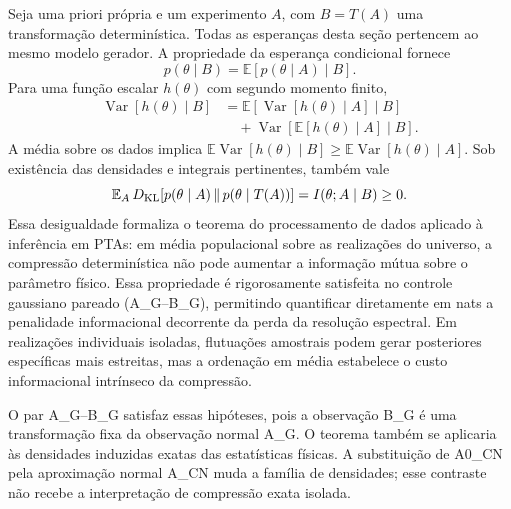 Seja uma priori própria e um experimento \(A\), com \(B=T(A)\) uma
transformação determinística. Todas as esperanças desta seção pertencem
ao mesmo modelo gerador. A propriedade da esperança condicional fornece
\begin{equation}
 p(\theta\mid B)=\mathbb E\!\left[p(\theta\mid A)\mid B\right].
 \label{eq:comp-posterior-condicional}
\end{equation}
Para uma função escalar \(h(\theta)\) com segundo momento finito,
\begin{align}
 \operatorname{Var}[h(\theta)\mid B]
 &=\mathbb E\!\left[\operatorname{Var}[h(\theta)\mid A]\mid B\right]
 \nonumber\\
 &\quad+\operatorname{Var}\!\left[\mathbb E[h(\theta)\mid A]\mid B\right].
 \label{eq:comp-variancia}
\end{align}
A média sobre os dados implica
\(\mathbb E\operatorname{Var}[h(\theta)\mid B]\geq
\mathbb E\operatorname{Var}[h(\theta)\mid A]\).
Sob existência das densidades e integrais pertinentes, também vale
\begin{equation}
 \mathbb E_A\,D_{\rm KL}\!\left[p(\theta\mid A)\,\Vert\,
                     p(\theta\mid T(A))\right]
 =I(\theta;A\mid B)\geq0.
 \label{eq:comp-informacao}
\end{equation}
Essa desigualdade formaliza o teorema do processamento de dados aplicado à
inferência em PTAs: em média populacional sobre as realizações do universo,
a compressão determinística não pode aumentar a informação mútua sobre o
parâmetro físico. Essa propriedade é rigorosamente satisfeita no controle
gaussiano pareado (A\_G--B\_G), permitindo quantificar diretamente em nats
a penalidade informacional decorrente da perda da resolução espectral. Em
realizações individuais isoladas, flutuações amostrais podem gerar posteriores
específicas mais estreitas, mas a ordenação em média estabelece o custo
informacional intrínseco da compressão.

O par A\_G--B\_G satisfaz essas hipóteses, pois a observação B\_G é uma
transformação fixa da observação normal A\_G. O teorema também se aplicaria
às densidades induzidas exatas das estatísticas físicas. A substituição
de A0\_CN pela aproximação normal A\_CN muda a família de densidades;
esse contraste não recebe a interpretação de compressão exata isolada.

